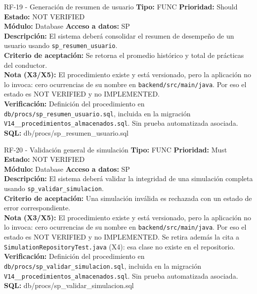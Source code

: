\documentclass[11pt,a4paper]{article}
\begin{document}
\begin{requisito}{RF-19 - Generación de resumen de usuario}
    \textbf{Tipo:} FUNC \quad \textbf{Prioridad:} Should \quad \textbf{Estado:} NOT VERIFIED \\[0.2cm]
    \textbf{Módulo:} Database \quad \textbf{Acceso a datos:} SP \\[0.2cm]
    \textbf{Descripción:} El sistema deberá consolidar el resumen de desempeño de un usuario usando \texttt{sp\_resumen\_usuario}. \\[0.2cm]
    \textbf{Criterio de aceptación:} Se retorna el promedio histórico y total de prácticas del conductor. \\[0.2cm]
    \textbf{Nota (X3/X5):} El procedimiento existe y está versionado, pero la aplicación no lo invoca: cero ocurrencias de su nombre en \texttt{backend/src/main/java}. Por eso el estado es NOT VERIFIED y no IMPLEMENTED. \\[0.2cm]
    \textbf{Verificación:} Definición del procedimiento en \texttt{db/procs/sp\_resumen\_usuario.sql}, incluida en la migración \texttt{V14\_\_procedimientos\_almacenados.sql}. Sin prueba automatizada asociada. \quad \textbf{SQL:} db/procs/sp\_resumen\_usuario.sql
\end{requisito}

\begin{requisito}{RF-20 - Validación general de simulación}
    \textbf{Tipo:} FUNC \quad \textbf{Prioridad:} Must \quad \textbf{Estado:} NOT VERIFIED \\[0.2cm]
    \textbf{Módulo:} Database \quad \textbf{Acceso a datos:} SP \\[0.2cm]
    \textbf{Descripción:} El sistema deberá validar la integridad de una simulación completa usando \texttt{sp\_validar\_simulacion}. \\[0.2cm]
    \textbf{Criterio de aceptación:} Una simulación inválida es rechazada con un estado de error correspondiente. \\[0.2cm]
    \textbf{Nota (X3/X5):} El procedimiento existe y está versionado, pero la aplicación no lo invoca: cero ocurrencias de su nombre en \texttt{backend/src/main/java}. Por eso el estado es NOT VERIFIED y no IMPLEMENTED. Se retira además la cita a \texttt{SimulationRepositoryTest.java} (X4): esa clase no existe en el repositorio. \\[0.2cm]
    \textbf{Verificación:} Definición del procedimiento en \texttt{db/procs/sp\_validar\_simulacion.sql}, incluida en la migración \texttt{V14\_\_procedimientos\_almacenados.sql}. Sin prueba automatizada asociada. \quad \textbf{SQL:} db/procs/sp\_validar\_simulacion.sql
\end{requisito}
\end{document}
